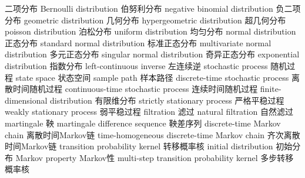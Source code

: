 {二项分布}
{Bernoulli distribution} 
{伯努利分布}
{negative binomial distribution} 
{负二项分布}
{geometric distribution} 
{几何分布}
{hypergeometric distribution} 
{超几何分布}
{poisson distribution} 
{泊松分布}
{uniform distribution} 
{均匀分布}
{normal distribution} 
{正态分布}
{standard normal distribution} 
{标准正态分布}
{multivariate normal distribution} 
{多元正态分布}
{singular normal distribution} 
{奇异正态分布}
{exponential distribution} 
{指数分布}
{left-continuous inverse} 
{左连续逆}
{stochastic process}
{随机过程}
{state space} 
{状态空间}
{sample path}
{样本路径}
{discrete-time stochastic process}
{离散时间随机过程}
{continuous-time stochastic process}
{连续时间随机过程}
{finite-dimensional distribution}
{有限维分布}
{strictly stationary process}
{严格平稳过程}
{weakly stationary process}
{弱平稳过程}
{filtration}
{滤过}
{natural filtration}
{自然滤过}
{martingale}
{鞅}
{martingale difference sequence}
{鞅差序列}
{discrete-time Markov chain}
{离散时间Markov链}
{time-homogeneous discrete-time Markov chain}
{齐次离散时间Markov链}
{transition probability kernel}
{转移概率核}
{initial distribution}
{初始分布}
{Markov property}
{Markov性}
{multi-step transition probability kernel}
{多步转移概率核}
